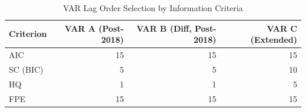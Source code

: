 \begin{table}[htbp]
\centering
\caption{VAR Lag Order Selection by Information Criteria} 
\label{tab:var_lag_selection}
\begin{tabular}{lrrr}
  \toprule
Criterion & VAR A (Post-2018) & VAR B (Diff, Post-2018) & VAR C (Extended) \\ 
  \midrule
AIC & 15 & 15 & 15 \\ 
  SC (BIC) & 5 & 5 & 10 \\ 
  HQ & 1 & 1 & 5 \\ 
  FPE & 15 & 15 & 15 \\ 
   \bottomrule
\end{tabular}
\end{table}
